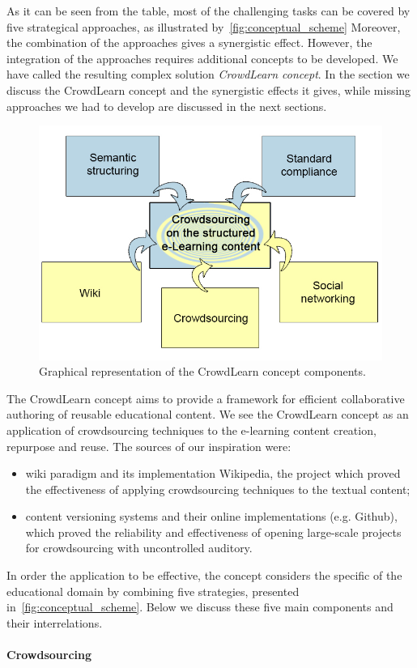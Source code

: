 \documentclass[PhD, Submit, ngerman,UKenglish,table]{scrbook}
\begin{document}
As it can be seen from the table, most of the challenging tasks can be covered by five strategical approaches, as illustrated by~\autoref{fig:conceptual_scheme} 
Moreover, the combination of the approaches gives a synergistic effect.
However, the integration of the approaches requires additional concepts to be developed.
We have called the resulting complex solution \emph{CrowdLearn concept}.
In the section we discuss the CrowdLearn concept and the synergistic effects it gives, while missing approaches we had to develop are discussed in the next sections.

\begin{figure}[!htb]
\centering
	\includegraphics[width=0.55\columnwidth]{images/CrowdLearn_updated.jpg}
	\caption{Graphical representation of the CrowdLearn concept components.}
	\label{fig:conceptual_scheme}
\end{figure}
The CrowdLearn concept aims to provide a framework for efficient collaborative authoring of reusable educational content.
We see the CrowdLearn concept as an application of crowdsourcing techniques to the e-learning content creation, repurpose and reuse.
The sources of our inspiration were:
\begin{itemize}
\item wiki paradigm and its implementation Wikipedia, the project which proved the effectiveness of applying crowdsourcing techniques to the textual content; 
\item content versioning systems and their online implementations (e.g. Github), which proved the reliability and effectiveness of opening large-scale projects for crowdsourcing with uncontrolled auditory. 
\end{itemize}
In order the application to be effective, the concept considers the specific of the educational domain by combining five strategies, presented in~\autoref{fig:conceptual_scheme}.
Below we discuss these five main components and their interrelations.

\paragraph{Crowdsourcing}
\end{document}

